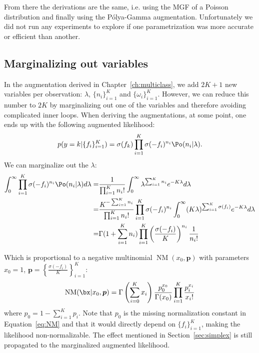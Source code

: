 From there the derivations are the same, i.e. using the \ac{MGF} of a Poisson distribution and finally using the P\'olya-Gamma augmentation.
Unfortunately we did not run any experiments to explore if one parametrization was more accurate or efficient than another.

\subsection{Marginalizing out variables}
In the augmentation derived in Chapter~\ref{ch:multiclass}, we add $2K + 1$ new variables per observation: $\lambda$, $\{n_i\}_{i=1}^K$ and $\{\omega_i\}_{i=1}^K$.
However, we can reduce this number to $2K$ by marginalizing out one of the variables and therefore avoiding complicated inner loops.
When deriving the augmentations, at some point, one ends up with the following augmented likelihood:
\begin{align}
    p(y=k|\{f_i\}_{i=1}^K) = \sigma(f_k) \prod_{i=1}^K \sigma(-f_i)^{n_i} \Po (n_i|\lambda).
\end{align}
We can marginalize out the $\lambda$:
\begin{align}
    \int_{0}^\infty \prod_{i=1}^K \sigma(-f_i)^{n_i} \Po (n_i|\lambda)d\lambda =& \frac{1}{\prod_{i=1}^K n_i!}\int_{0}^\infty \lambda^{\sum_{i=1}^K n_i}e^{-K\lambda}d\lambda \nonumber\\
    =& \frac{K^{-\sum_{i=1}^K n_i}}{\prod_{i=1}^K n_i!}\prod_{i=1}^K \sigma(-f_i)^{n_i} \int_{0}^\infty (K\lambda)^{\sum_{i=1}^K \sigma(f_i)}e^{-K\lambda}d\lambda \nonumber\\
    =& \Gamma(1 + \sum_{i=1}^K n_i) \prod_{i=1}^K \left(\frac{\sigma(-f_i)}{K}\right)^{n_i}\frac{1}{n_i!} \label{eq:NM}
\end{align}

Which is proportional to a negative multinomial $\operatorname{NM}(x_0, \boldsymbol{p})$ with parameters $x_0=1$, $\boldsymbol{p}=\left\{\frac{\sigma(-f_i)}{K}\right\}_{i=1}^K$:
\begin{align*}
    \operatorname{NM}(\bx|x_0,\boldsymbol{p}) = \Gamma\left(\sum_{i=0}^K x_i\right) \frac{p_0^{x_0}}{\Gamma(x_0)}\prod_{i=1}^K \frac{p_i^{x_i}}{x_i!}   
\end{align*}
where $p_0 = 1 - \sum_{i=1}^K p_i$.
Note that $p_0$ is the missing normalization constant in Equation~\ref{eq:NM} and that it would directly depend on $\{f_i\}_{i=1}^K$, making the likelihood non-normalizable.
The effect mentioned in Section~\ref{sec:simplex} is still propagated to the marginalized augmented likelihood.

